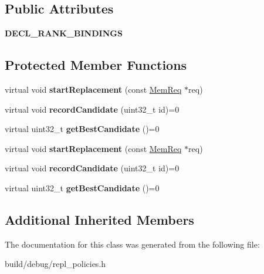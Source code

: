 \subsection*{Public Attributes}
\begin{DoxyCompactItemize}
\item 
\hypertarget{classLegacyReplPolicy_a78a3fe68b8dfe92cbd7d5b0d3c7b85a0}{{\bfseries D\-E\-C\-L\-\_\-\-R\-A\-N\-K\-\_\-\-B\-I\-N\-D\-I\-N\-G\-S}}\label{classLegacyReplPolicy_a78a3fe68b8dfe92cbd7d5b0d3c7b85a0}

\end{DoxyCompactItemize}
\subsection*{Protected Member Functions}
\begin{DoxyCompactItemize}
\item 
\hypertarget{classLegacyReplPolicy_a65938073835253f0fba77e821c1dbef0}{virtual void {\bfseries start\-Replacement} (const \hyperlink{structMemReq}{Mem\-Req} $\ast$req)}\label{classLegacyReplPolicy_a65938073835253f0fba77e821c1dbef0}

\item 
\hypertarget{classLegacyReplPolicy_ab1249dd2c85086076d8f666628c0322e}{virtual void {\bfseries record\-Candidate} (uint32\-\_\-t id)=0}\label{classLegacyReplPolicy_ab1249dd2c85086076d8f666628c0322e}

\item 
\hypertarget{classLegacyReplPolicy_a5fe3f005b39d8bba634f293aaf486572}{virtual uint32\-\_\-t {\bfseries get\-Best\-Candidate} ()=0}\label{classLegacyReplPolicy_a5fe3f005b39d8bba634f293aaf486572}

\item 
\hypertarget{classLegacyReplPolicy_a65938073835253f0fba77e821c1dbef0}{virtual void {\bfseries start\-Replacement} (const \hyperlink{structMemReq}{Mem\-Req} $\ast$req)}\label{classLegacyReplPolicy_a65938073835253f0fba77e821c1dbef0}

\item 
\hypertarget{classLegacyReplPolicy_ab1249dd2c85086076d8f666628c0322e}{virtual void {\bfseries record\-Candidate} (uint32\-\_\-t id)=0}\label{classLegacyReplPolicy_ab1249dd2c85086076d8f666628c0322e}

\item 
\hypertarget{classLegacyReplPolicy_a5fe3f005b39d8bba634f293aaf486572}{virtual uint32\-\_\-t {\bfseries get\-Best\-Candidate} ()=0}\label{classLegacyReplPolicy_a5fe3f005b39d8bba634f293aaf486572}

\end{DoxyCompactItemize}
\subsection*{Additional Inherited Members}


The documentation for this class was generated from the following file\-:\begin{DoxyCompactItemize}
\item 
build/debug/repl\-\_\-policies.\-h\end{DoxyCompactItemize}
